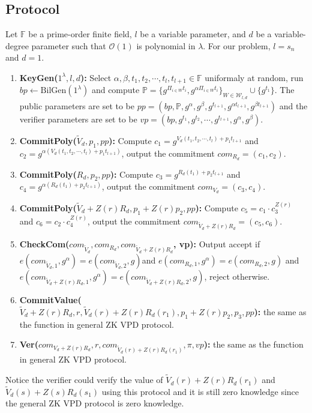 \subsection{Protocol}
Let $\mathbb{F}$ be a prime-order finite field, $l$ be a variable parameter, and $d$ be a variable-degree parameter such that $\mathcal{O}(1)$ is polynomial in $\lambda$. For our problem, $l = s_n$ and $d = 1$.
\begin{enumerate}
\item \textbf{KeyGen($1^{\lambda}, l, d$):} Select $\alpha, \beta, t_1, t_2, \cdots, t_l, t_{l+1} \in \mathbb{F}$ uniformaly at random, run $bp \leftarrow \text{BilGen}(1^{\lambda})$ and compute $\mathbb{P} = \{g^{\Pi_{i \in W}t_i}, g^{\alpha \Pi_{i \in W}t_i}\}_{W \in \mathcal{W}_{l, d}} \cup \{g^{t_1}\}$. The public parameters are set to be $pp = (bp, \mathbb{P}, g^{\alpha}, g^{\beta}, g^{t_{l+1}}, g^{\alpha t_{l+1}}, g^{\beta t_{l+1}})$ and the verifier parameters are set to be $vp = (bp, g^{t_1}, g^{t_2}, \cdots, g^{t_{l+1}}, g^{\alpha}, g^{\beta})$.

\item \textbf{CommitPoly($\tilde{V}_d, p_1, pp$):} Compute $c_1 = g^{V_d(t_1, t_2, \cdots, t_l) + p_1t_{l+1}}$ and $c_2 = g^{\alpha(V_d(t_1, t_2, \cdots, t_l)+ p_1t_{l+1})}$, output the commitment $com_{R_d} = (c_1, c_2)$.

\item \textbf{CommitPoly($R_d, p_2, pp$):} Compute $c_3 = g^{R_d(t_1) + p_2t_{l+1}}$ and $c_4 = g^{\alpha(R_d(t_1)+ p_2t_{l+1})}$, output the commitment $com_{V_d} = (c_3, c_4)$.

\item \textbf{CommitPoly($\tilde{V}_d + Z(r)R_d, p_1 + Z(r)p_2, pp$):} Compute $c_5 = c_1 \cdot c_3^{Z(r)}$ and $c_6 = c_2 \cdot c_4^{Z(r)}$, output the commitment $com_{\tilde{V}_d + Z(r)R_d} = (c_5, c_6)$.

\item \textbf{CheckCom($com_{\tilde{V}_d}, com_{R_d}, com_{\tilde{V}_d + Z(r)R_d}$, vp):} Output accept if $e(com_{\tilde{V}_d, 1}, g^\alpha) = e(com_{\tilde{V}_d, 2}, g)$and $e(com_{R_d, 1}, g^\alpha) = e(com_{R_d, 2}, g)$ and $e(com_{\tilde{V}_d + Z(r)R_d, 1}, g^\alpha) = e(com_{\tilde{V}_d + Z(r)R_d, 2}, g)$, reject otherwise.

\item \textbf{CommitValue($\tilde{V}_d + Z(r)R_d, r, \tilde{V}_d(r) + Z(r)R_d(r_1), p_1 + Z(r)p_2, p_3, pp$):} the same as the  function in general ZK VPD protocol. 
\item \textbf{Ver($com_{V_d + Z(r)R_d}, r, com_{\tilde{V}_d(r) + Z(r)R_d(r_1)}, \pi, vp$):} the same as the  function in general ZK VPD protocol. 
\end{enumerate} 

Notice the verifier could verify the value of $\tilde{V}_d(r) + Z(r)R_d(r_1)$ and $\tilde{V}_d(s) + Z(s)R_d(s_1)$ using this protocol and it is still zero knowledge since the general ZK VPD protocol is zero knowledge. 











